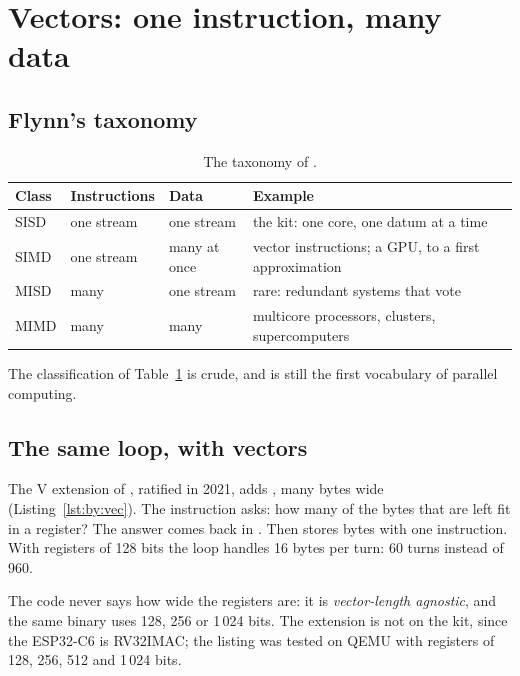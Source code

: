 \section{Vectors: one instruction, many data}

\subsection{Flynn's taxonomy}

\begin{table}[htb]
\centering\small
\caption{The taxonomy of \citet{flynn1972}.}\label{tab:by:flynn}
\begin{tabular}{@{}llll@{}}
\toprule
\textbf{Class} & \textbf{Instructions} & \textbf{Data} & \textbf{Example}\\
\midrule
SISD & one stream & one stream & the kit: one core, one datum at a time\\
SIMD & one stream & many at once & vector instructions; a GPU, to a first approximation\\
MISD & many & one stream & rare: redundant systems that vote\\
MIMD & many & many & multicore processors, clusters, supercomputers\\
\bottomrule
\end{tabular}
\end{table}

The classification of Table~\ref{tab:by:flynn} is crude, and is still the
first vocabulary of parallel computing.

\subsection{The same loop, with vectors}


The V extension of \riscv, ratified in 2021, adds ,
many bytes wide (Listing~\ref{lst:by:vec}). The instruction 
asks: how many of the bytes that are left fit in a register? The answer
comes back in . Then  stores  bytes with one
instruction. With registers of 128 bits the loop handles 16 bytes per turn:
60 turns instead of 960.

The code never says how wide the registers are: it is \emph{vector-length
agnostic}, and the same binary uses 128, 256 or 1\,024 bits. The extension is
not on the kit, since the ESP32-C6 is RV32IMAC; the listing was tested on
QEMU with registers of 128, 256, 512 and 1\,024 bits.

